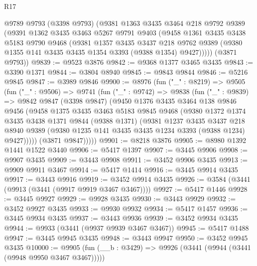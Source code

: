 \begin{lexlean}{R17}
\begin{coremodule}
    @9789
      @9793
      (@3398 @9793)
      (@9381
        @1363
        @3435
        @3464
        @218
        @9792
        @9389
        (@9391
          @1362
          @3435
          @3463
          @5267
          @9791
          @9403
          (@9458
            @1361
            @3435
            @3438
            @5183
            @9790
            @9468
            (@9381
              @1357
              @3435
              @3437
              @218
              @9762
              @9389
              (@9380 @1355 @141 @3435 @3435 @1354 @3393 (@9388 @1354) @9427)))))
      (@3871 @9793))
@9839 := @9523 @3876
@9842 := @9368 @1377 @3465 @3435
@9843 := @3390 @1371
@9844 := @3804 @8940
@9845 := @9843 @9844
@9846 := @5216 @9845
@9847 := @3989 @9846
@9900 := @8976
    (fun ("_" : @8219) =>
    @9505
      (fun ("_" : @9506) =>
      @9741
        (fun ("_" : @9742) =>
        @9838
          (fun ("_" : @9839) =>
          @9842
            @9847
            (@3398 @9847)
            (@9450
              @1376
              @3435
              @3464
              @138
              @9846
              @9456
              (@9458
                @1375
                @3435
                @3463
                @5183
                @9845
                @9468
                (@9380
                  @1372
                  @1374
                  @3435
                  @3438
                  @1371
                  @9844
                  (@9388 @1371)
                  (@9381
                    @1237
                    @3435
                    @3437
                    @218
                    @8940
                    @9389
                    (@9380 @1235 @141 @3435 @3435 @1234 @3393 (@9388 @1234) @9427)))))
            (@3871 @9847)))))
@9901 := @8218 @3876
@9905 := @8980 @1392 @1441 @1522 @3440
@9906 := @5417 @1397
@9907 := @3445 @9906
@9908 := @9907 @3435
@9909 := @3443 @9908
@9911 := @3452 @9906 @3435
@9913 := @9909 @9911 @3467
@9914 := @5417 @1414
@9916 := @3445 @9914 @3435
@9917 := @3443 @9916
@9919 := @3452 @9914 @3435
@9926 := @3584 (@3441 (@9913 (@3441 (@9917 @9919 @3467 @3467))))
@9927 := @5417 @1446
@9928 := @3445 @9927
@9929 := @9928 @3435
@9930 := @3443 @9929
@9932 := @3452 @9927 @3435
@9933 := @9930 @9932
@9934 := @5417 @1457
@9936 := @3445 @9934 @3435
@9937 := @3443 @9936
@9939 := @3452 @9934 @3435
@9944 := @9933 (@3441 (@9937 @9939 @3467 @3467))
@9945 := @5417 @1488
@9947 := @3445 @9945 @3435
@9948 := @3443 @9947
@9950 := @3452 @9945 @3435
@10000 := @9905
    (fun (__b : @3429) => @9926 (@3441 (@9944 (@3441 (@9948 @9950 @3467 @3467)))))

\end{coremodule}
\end{lexlean}
